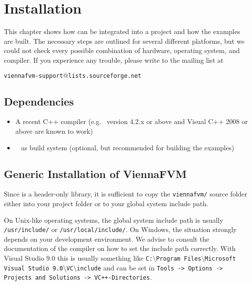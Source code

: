 \chapter{Installation}

This chapter shows how {\ViennaFVM} can be integrated into a project and how
the examples are built. The necessary steps are outlined for several different
platforms, but we could not check every possible combination of hardware,
operating system, and compiler. If you experience any trouble, please write to
the mailing list at \\
\begin{center}
\texttt{viennafvm-support$@$lists.sourceforge.net}
\end{center}


\section{Dependencies}
\label{dependencies}

\begin{itemize}
 \item A recent C++ compiler (e.g.~{\GCC} version 4.2.x or above and Visual C++
2008 or above are known to work)
 \item {\CMake}~\cite{cmake} as build system (optional, but recommended
for building the examples)
\end{itemize}


\section{Generic Installation of ViennaFVM} \label{sec:viennafvm-installation}
Since {\ViennaFVM} is a header-only library, it is sufficient to copy the
\lstinline|viennafvm/| source folder either into your project folder or to your global system
include path. 

On Unix-like operating systems, the global system include path is usually \lstinline|/usr/include/| or \lstinline|/usr/local/include/|.
On Windows, the situation strongly depends on your development environment. We
advise to consult the documentation of the compiler on how to set the include
path correctly. With Visual Studio 9.0 this is usually something like
\texttt{C:$\setminus$Program Files$\setminus$Microsoft Visual Studio
9.0$\setminus$VC$\setminus$include}
and can be set in \texttt{Tools -> Options -> Projects and Solutions ->
VC++-\-Directories}.


